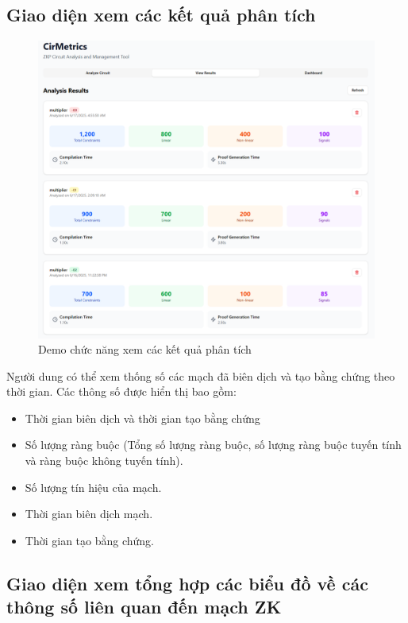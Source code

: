 \subsection{Giao diện xem các kết quả phân tích}
\begin{figure}[H]
    \centering
    \includegraphics[width=\textwidth]{imgs/resultscreen.png}
    \caption{Demo chức năng xem các kết quả phân tích}
    \label{fig:chapter6-resultscreen}
\end{figure}

Người dung có thể xem thống số các mạch đã biên dịch và tạo bằng chứng theo thời gian. Các thông số được hiển thị bao gồm:
\begin{itemize}
    \item Thời gian biên dịch và thời gian tạo bằng chứng
    \item Số lượng ràng buộc (Tổng số lượng ràng buộc, số lượng ràng buộc tuyến tính và ràng buộc không tuyến tính).
    \item Số lượng tín hiệu của mạch.
    \item Thời gian biên dịch mạch.
    \item Thời gian tạo bằng chứng.
\end{itemize}

\subsection{Giao diện xem tổng hợp các biểu đồ về các thông số liên quan đến mạch ZK}

